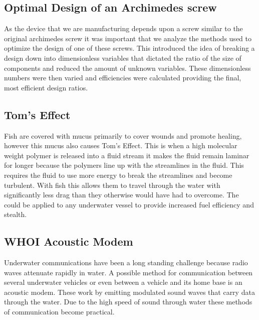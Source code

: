 \documentclass{report}
\begin{document}
\subsection{Optimal Design of an Archimedes screw}
As the device that we are manufacturing depends upon a screw similar to the original archimedes screw it was important that we analyze the methods used to optimize the design of one of these screws.\cite{Rorres00} This introduced the idea of breaking a design down into dimensionless variables that dictated the ratio of the size of components and reduced the amount of unknown variables. These dimensionless numbers were then varied and efficiencies were calculated providing the final, most efficient design ratios.
\subsection{Tom's Effect}
Fish are covered with mucus primarily to cover wounds and promote healing, however this mucus also causes Tom’s Effect. This is when a high molecular weight polymer is released into a fluid stream it makes the fluid remain laminar for longer because the polymers line up with the streamlines in the fluid. This requires the fluid to use more energy to break the streamlines and become turbulent. With fish this allows them to travel through the water with significantly less drag than they otherwise would have had to overcome. The could be applied to any underwater vessel to provide increased fuel efficiency and stealth.
\subsection{WHOI Acoustic Modem}
 Underwater communications have been a long standing challenge because radio waves attenuate rapidly in water. A possible method for communication between several underwater vehicles or even between a vehicle and its home base is an acoustic modem. These work by emitting modulated sound waves that carry data through the water. Due to the high speed of sound through water these methods of communication become practical. 
\end{document}
